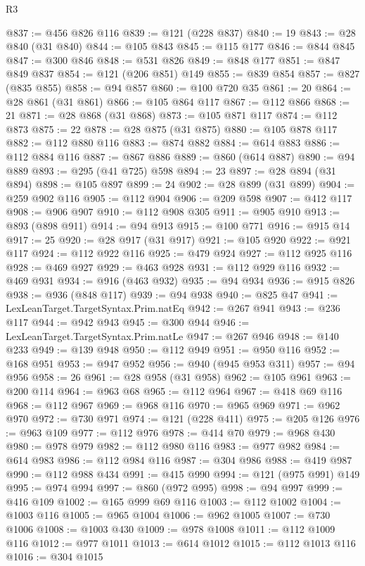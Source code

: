\begin{lexlean}{R3}
\begin{coremodule}
{{{{{{{{{{{{{{{{{{{{{{{{{{{{{{{{{{{{{{{{{{{{{{{{{{{{{{{{{{{{{{{{{{{{{{{{{{{@837 := @456 @826 @116
@839 := @121 (@228 @837)
@840 := 19
@843 := @28 @840 (@31 @840)
@844 := @105 @843
@845 := @115 @177
@846 := @844 @845
@847 := @300 @846
@848 := @531 @826
@849 := @848 @177
@851 := @847 @849 @837
@854 := @121 (@206 @851) @149
@855 := @839 @854
@857 := @827 (@835 @855)
@858 := @94 @857
@860 := @100 @720 @35
@861 := 20
@864 := @28 @861 (@31 @861)
@866 := @105 @864 @117
@867 := @112 @866
@868 := 21
@871 := @28 @868 (@31 @868)
@873 := @105 @871 @117
@874 := @112 @873
@875 := 22
@878 := @28 @875 (@31 @875)
@880 := @105 @878 @117
@882 := @112 @880 @116
@883 := @874 @882
@884 := @614 @883
@886 := @112 @884 @116
@887 := @867 @886
@889 := @860 (@614 @887)
@890 := @94 @889
@893 := @295 (@41 @725) @598
@894 := 23
@897 := @28 @894 (@31 @894)
@898 := @105 @897
@899 := 24
@902 := @28 @899 (@31 @899)
@904 := @259 @902 @116
@905 := @112 @904
@906 := @209 @598
@907 := @412 @117
@908 := @906 @907
@910 := @112 @908 @305
@911 := @905 @910
@913 := @893 (@898 @911)
@914 := @94 @913
@915 := @100 @771
@916 := @915 @14
@917 := 25
@920 := @28 @917 (@31 @917)
@921 := @105 @920
@922 := @921 @117
@924 := @112 @922 @116
@925 := @479 @924
@927 := @112 @925 @116
@928 := @469 @927
@929 := @463 @928
@931 := @112 @929 @116
@932 := @469 @931
@934 := @916 (@463 @932)
@935 := @94 @934
@936 := @915 @826
@938 := @936 (@848 @117)
@939 := @94 @938
@940 := @825 @47
@941 := LexLeanTarget.TargetSyntax.Prim.natEq
@942 := @267 @941
@943 := @236 @117
@944 := @942 @943
@945 := @300 @944
@946 := LexLeanTarget.TargetSyntax.Prim.natLe
@947 := @267 @946
@948 := @140 @233
@949 := @139 @948
@950 := @112 @949
@951 := @950 @116
@952 := @168 @951
@953 := @947 @952
@956 := @940 (@945 @953 @311)
@957 := @94 @956
@958 := 26
@961 := @28 @958 (@31 @958)
@962 := @105 @961
@963 := @200 @114
@964 := @963 @68
@965 := @112 @964
@967 := @418 @69 @116
@968 := @112 @967
@969 := @968 @116
@970 := @965 @969
@971 := @962 @970
@972 := @730 @971
@974 := @121 (@228 @411)
@975 := @205 @126
@976 := @963 @109
@977 := @112 @976
@978 := @414 @70
@979 := @968 @430
@980 := @978 @979
@982 := @112 @980 @116
@983 := @977 @982
@984 := @614 @983
@986 := @112 @984 @116
@987 := @304 @986
@988 := @419 @987
@990 := @112 @988 @434
@991 := @415 @990
@994 := @121 (@975 @991) @149
@995 := @974 @994
@997 := @860 (@972 @995)
@998 := @94 @997
@999 := @416 @109
@1002 := @165 @999 @69 @116
@1003 := @112 @1002
@1004 := @1003 @116
@1005 := @965 @1004
@1006 := @962 @1005
@1007 := @730 @1006
@1008 := @1003 @430
@1009 := @978 @1008
@1011 := @112 @1009 @116
@1012 := @977 @1011
@1013 := @614 @1012
@1015 := @112 @1013 @116
@1016 := @304 @1015
}}}}}}}}}}}}}}}}}}}}}}}}}}}}}}}}}}}}}}}}}}}}}}}}}}}}}}}}}}}}}}}}}}}}}}}}}}}
\end{coremodule}
\end{lexlean}
